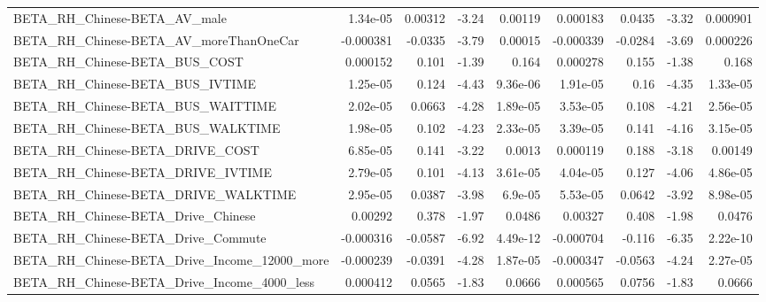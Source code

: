 \begin{tabular}{lrrrrrrrr}
BETA\_RH\_Chinese-BETA\_AV\_male                       &    1.34e-05 &      0.00312 &     -3.24 &  0.00119 &   0.000183 &      0.0435 &        -3.32 &      0.000901 \\
BETA\_RH\_Chinese-BETA\_AV\_moreThanOneCar             &   -0.000381 &      -0.0335 &     -3.79 &  0.00015 &  -0.000339 &     -0.0284 &        -3.69 &      0.000226 \\
BETA\_RH\_Chinese-BETA\_BUS\_COST                      &    0.000152 &        0.101 &     -1.39 &    0.164 &   0.000278 &       0.155 &        -1.38 &         0.168 \\
BETA\_RH\_Chinese-BETA\_BUS\_IVTIME                    &    1.25e-05 &        0.124 &     -4.43 & 9.36e-06 &   1.91e-05 &        0.16 &        -4.35 &      1.33e-05 \\
BETA\_RH\_Chinese-BETA\_BUS\_WAITTIME                  &    2.02e-05 &       0.0663 &     -4.28 & 1.89e-05 &   3.53e-05 &       0.108 &        -4.21 &      2.56e-05 \\
BETA\_RH\_Chinese-BETA\_BUS\_WALKTIME                  &    1.98e-05 &        0.102 &     -4.23 & 2.33e-05 &   3.39e-05 &       0.141 &        -4.16 &      3.15e-05 \\
BETA\_RH\_Chinese-BETA\_DRIVE\_COST                    &    6.85e-05 &        0.141 &     -3.22 &   0.0013 &   0.000119 &       0.188 &        -3.18 &       0.00149 \\
BETA\_RH\_Chinese-BETA\_DRIVE\_IVTIME                  &    2.79e-05 &        0.101 &     -4.13 & 3.61e-05 &   4.04e-05 &       0.127 &        -4.06 &      4.86e-05 \\
BETA\_RH\_Chinese-BETA\_DRIVE\_WALKTIME                &    2.95e-05 &       0.0387 &     -3.98 &  6.9e-05 &   5.53e-05 &      0.0642 &        -3.92 &      8.98e-05 \\
BETA\_RH\_Chinese-BETA\_Drive\_Chinese                 &     0.00292 &        0.378 &     -1.97 &   0.0486 &    0.00327 &       0.408 &        -1.98 &        0.0476 \\
BETA\_RH\_Chinese-BETA\_Drive\_Commute                 &   -0.000316 &      -0.0587 &     -6.92 & 4.49e-12 &  -0.000704 &      -0.116 &        -6.35 &      2.22e-10 \\
BETA\_RH\_Chinese-BETA\_Drive\_Income\_12000\_more       &   -0.000239 &      -0.0391 &     -4.28 & 1.87e-05 &  -0.000347 &     -0.0563 &        -4.24 &      2.27e-05 \\
BETA\_RH\_Chinese-BETA\_Drive\_Income\_4000\_less        &    0.000412 &       0.0565 &     -1.83 &   0.0666 &   0.000565 &      0.0756 &        -1.83 &        0.0666 \\

\end{tabular}
